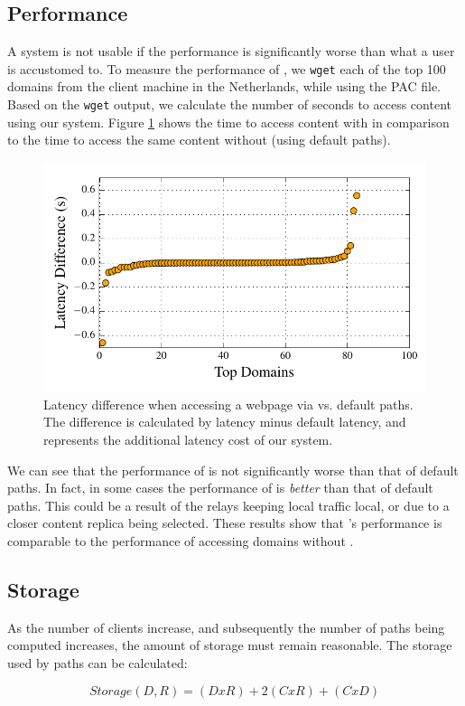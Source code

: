 \subsection{Performance}
A system is not usable if the performance is significantly worse than what a user
is accustomed to.  To measure the performance of \system{}, we {\tt wget} each 
of the top 100 domains from the client machine in the Netherlands, while 
using the PAC file.  Based on the {\tt wget} output, we calculate the number 
of seconds to access content using our system. Figure \ref{fig:latency} shows 
the time to access content with \system{} in comparison to the time to access the 
same content without \system{} (using default paths).  

\begin{figure}[t]
\centering
\includegraphics[width=.5\textwidth]{latency}
\caption{Latency difference when accessing a webpage via \system{} vs. default paths. 
The difference is calculated by \system{} latency minus default latency, and represents 
the additional latency cost of our system.}
\label{fig:latency}
\end{figure}

We can see that the performance of \system{} is not significantly worse than that 
of default paths.  In fact, in some cases the performance of \system{} is {\it 
better} than that of default paths.  This could be a result of the relays 
keeping local traffic local, or due to a closer content replica being selected. 
These results show that \system{}'s performance is comparable to the performance 
of accessing domains without \system{}.

\subsection{Storage}
As the number of clients increase, and subsequently the number of paths being 
computed increases, the amount of storage must remain reasonable.  The storage 
used by paths can be calculated:

\[Storage(D,R) = (D x R) + 2(C x R) + (C x D) \]

